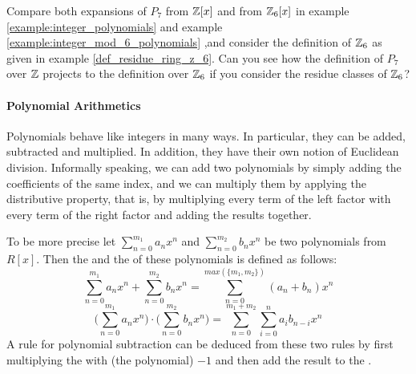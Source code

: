 \begin{exercise}
Compare both expansions of $P_7$ from $\mathbb{Z}[x]$ and from $\mathbb{Z}_6[x]$ in example \ref{example:integer_polynomials} and example \ref{example:integer_mod_6_polynomials} ,and consider the definition of $\mathbb{Z}_6$ as given in example \ref{def_residue_ring_z_6}. Can you see how the definition of $P_7$ over $\mathbb{Z}$ projects to the definition over $\mathbb{Z}_6$ if you consider the residue classes of $\mathbb{Z}_6$?
\end{exercise}
\paragraph{Polynomial Arithmetics}
Polynomials behave like integers in many ways. In particular, they can be added, subtracted and multiplied. In addition, they have their own notion of Euclidean division. Informally speaking, we can add two polynomials  by simply adding the coefficients of the same index, and we can multiply them by applying the distributive property, that is, by multiplying every term of the left factor with every term of the right factor and adding the results together.

To be more precise let $ \sum _{n = 0} ^{m_1}{a} _{n}{x} ^{n} $ and
$ \sum _{n = 0} ^{m_2}{b} _{n}{x^n} $ be two polynomials from $ R[x]$. Then the  and the  of these polynomials is defined as follows:
\begin{equation}
\sum _{n = 0} ^{m_1}{a} _{n}{x} ^{n} + \sum _{n = 0} ^{m_2}{b} _{n}{x } ^{n} = \sum _{n = 0} ^{max(\{m_1,m_2\})}{({a} _{n} +{b} _{n})}{x} ^{n}
\end{equation}
\begin{equation}
\bigg (\sum _{n = 0} ^{m_1}{a} _{n}{x} ^{n} \bigg) \cdot \bigg (\sum _{n = 0} ^{m_2 }{b} _{n}{x} ^{n} \bigg) = \sum _{n = 0} ^{m_1+m_2} \sum _{i = 0} ^{n}{a} _{i }{{b} _{n-i}}{x} ^{n}
\end{equation}
A rule for polynomial subtraction can be deduced from these two rules by first multiplying the \href{https://www.splashlearn.com/math-vocabulary/subtraction/subtrahend}{} 
with (the polynomial) $-1$ and then add the result to the \href{https://www.splashlearn.com/math-vocabulary/subtraction/minuend}{}.

